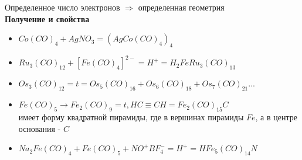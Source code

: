 \begin{figure} [H]
	\centering {\texttt{[image: ff3]}}
\end{figure}
Определенное число электронов $\Rightarrow$ определенная геометрия \\
\textbf{Получение и свойства}
\begin{itemize}
	\item $Co(CO)_4 + AgNO_3 = (AgCo(CO)_4)_4 $
	\item $ Ru_3(CO)_{12} + \left[ Fe(CO)_4 \right]^{2-} = H^+ = H_2FeRu_3(CO)_{13} $
	\item $Os_3(CO)_{12} = t = Os_5(CO)_{16} + Os_6(CO)_{18} + Os_7(CO)_{21} ... $
	\item $ Fe(CO)_5 \rightarrow Fe_2(CO)_9 = t, HC\equiv CH = Fe_2(CO)_{15}C $ \\ имеет форму квадратной пирамиды, где в вершинах пирамиды $Fe$, а в центре основания - $C$
	\item $ Na_2Fe(CO)_4 + Fe(CO)_5 + NO^+BF_4^- = H^+ = HFe_5(CO)_{14}N $
	\begin{figure} [H]
		\centering {\texttt{[image: ff4]}}
	\end{figure}
\end{itemize}

